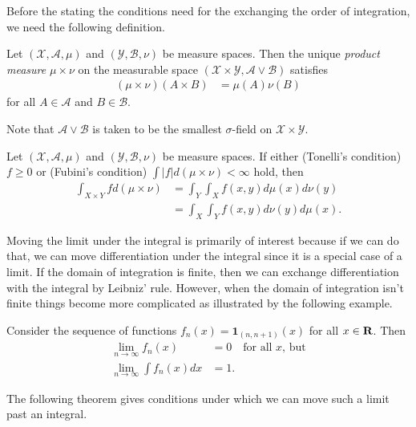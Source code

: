 \documentclass[twoside]{article}
\begin{document}
Before the stating the conditions need for the exchanging the order of integration,
we need the following definition.
\begin{definition} Let $(\mathcal X, \mathcal A, \mu)$ and $(\mathcal Y, \mathcal B, \nu)$
  be measure spaces.  Then the unique \emph{product measure} $\mu \times \nu$ on
  the measurable space $(\mathcal X \times \mathcal Y, \mathcal A \vee \mathcal B)$ satisfies
  \begin{align*}
    (\mu \times \nu)(A\times B) &= \mu(A)\nu(B)
  \end{align*}
  for all $A \in  \mathcal A$ and $B \in \mathcal B$.
\end{definition}
Note that $\mathcal A \vee \mathcal B$ is taken to be the smallest $\sigma$-field on
$\mathcal X \times \mathcal Y$.
\begin{theorem}\citep[Theorem 1.7, p.~13]{keener}
  Let $(\mathcal X, \mathcal A, \mu)$ and $(\mathcal Y, \mathcal B, \nu)$
  be measure spaces.  If either (Tonelli's condition) $f \geq 0$ or (Fubini's
  condition) $\int |f| d(\mu \times \nu) < \infty$  hold, then
  \begin{align*}
    \int_{X\times Y} f d(\mu \times \nu) &= \int_Y \int_X f(x, y) d\mu(x) d\nu(y) \\
    &= \int_X \int_Y f(x, y) d\nu(y) d\mu(x).
  \end{align*}
\end{theorem}

Moving the limit under the integral is primarily of interest because if we can
do that, we can move differentiation under the integral since it is a special
case of a limit.  If the domain of integration is finite, then we can exchange
differentiation with the integral by Leibniz' rule.  However, when the domain
of integration isn't finite things become more complicated as illustrated by
the following example.

\begin{example}
Consider the sequence of functions $f_n(x) = \mathbf{1}_{(n, n+1)}(x)$ for all
$x \in \mathbf{R}$.  Then
\begin{align*}
  \lim_{n \rightarrow \infty} f_n(x) &= 0 \quad \text{for all $x$, but}\\
  \lim_{n \rightarrow \infty} \int f_n(x) dx &= 1.
\end{align*}
\end{example}

The following theorem gives conditions under which we can move such a limit
past an integral.
\end{document}

